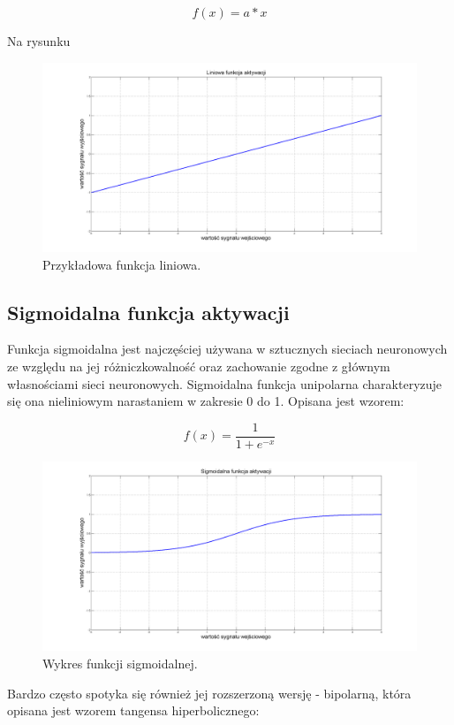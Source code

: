 $$ 
f(x) = a*x
$$

Na rysunku
\begin{figure}[!htbp]
\centering
\includegraphics[width=1\linewidth]{./include/lin}
\caption{Przykładowa funkcja liniowa.}
\label{fig:lin}
\end{figure}

\subsection{Sigmoidalna funkcja aktywacji}
Funkcja sigmoidalna jest najczęściej używana w sztucznych sieciach neuronowych ze względu na jej różniczkowalność oraz zachowanie zgodne z głównym własnościami sieci neuronowych. Sigmoidalna funkcja unipolarna charakteryzuje się ona nieliniowym narastaniem w zakresie 0 do 1. Opisana jest wzorem:

$$ 
f(x) = \frac{1}{1 + e^{-x}}
$$

\begin{figure}[!htbp]
\centering
\includegraphics[width=1\linewidth]{./include/sig}
\caption{Wykres funkcji sigmoidalnej.}
\label{fig:sig}
\end{figure}

Bardzo często spotyka się również jej rozszerzoną wersję - bipolarną, która opisana jest wzorem tangensa hiperbolicznego:

